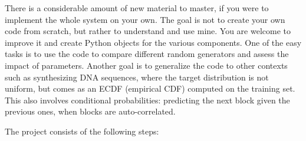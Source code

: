 \documentclass[oneside,10pt]{book}
\begin{document}
\noindent There is a considerable amount of new material to master, if you were to implement the whole system on your own. The goal is not to create your own code from scratch, but rather to understand and use mine. You are welcome to improve it and create Python objects for the various components. 
One of the easy tasks is to use the code to compare different random generators and assess the impact of parameters. Another goal is to generalize the code to other contexts such as synthesizing DNA sequences, where the target distribution is not uniform, but comes as an ECDF (empirical CDF) computed on the training set. This also involves conditional probabilities: predicting the next block given the previous ones, when blocks are auto-correlated.

\noindent The project consists of the following steps:\vspace{1ex}
\end{document}

